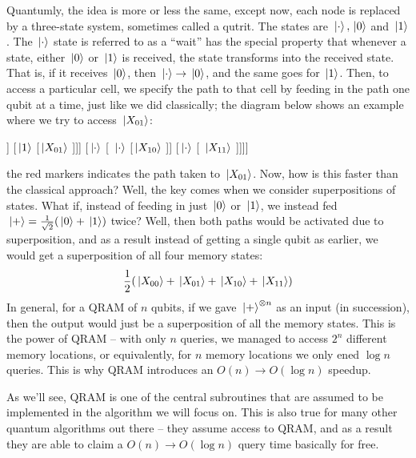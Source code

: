 \documentclass[11pt]{article}
\begin{document}
	Quantumly, the idea is more or less the same, except now, each node is replaced by a three-state system, 
	sometimes called a qutrit. The states are \( \ket*{\cdot}, \ket*{0} \) and \( \ket*{1} \). The \( \ket*{\cdot} \) 
	state is referred to as a ``wait'' has the special property that whenever a state, either \( \ket*{0} \) 
	or \( \ket*{1} \) is received, the state transforms into the received state. That is, if it receives \( \ket*{0} \),
	then \( \ket*{\cdot} \to \ket*{0} \), and the same goes for \( \ket*{1} \). Then, to access a particular 
	cell, we specify the path to that cell by feeding in the path one qubit at a time, 
	just like we did classically; the diagram below shows an example 
	where we try to access \( \ket*{X_{01}} \):

	\begin{center}
		\begin{forest}
			[\( \cdot \) [\textcolor{red}{\( \ket*{0} \)} [\( \ket*{\cdot} \) [ \( \ket*{X_{00}} \)]] 
			[\textcolor{red}{\( \ket*{1} \)} 
			[\textcolor{red}{\( \ket*{X_{01}} \) }]]] [\( \ket*{\cdot} \) 
			[ \( \ket*{\cdot} \) [\( \ket*{X_{10}} \) ]] [\( \ket*{\cdot} \) [ \( \ket*{X_{11}} \) ]]]]
		\end{forest}
	\end{center}
	the red markers indicates the path taken to \( \ket*{X_{01}} \). Now, how is this faster than the classical 
	approach? Well, the key comes when we consider superpositions of states. What if, instead of feeding in  
	just \( \ket*{0} \) or \( \ket*{1} \), we instead fed \( \ket*{+} = \frac{1}{\sqrt{2} }(\ket*{0} + \ket*{1}) \) 
	twice? Well, then both paths would be activated due to superposition, and as a result instead of getting a single 
	qubit as earlier, we would get a superposition of all four memory states: 
	\[
	\frac{1}{2}(\ket*{X_{00}} + \ket*{X_{01}} + \ket*{X_{10}} + \ket*{X_{11}})
	\] 
	In general, for a QRAM of \( n \) qubits, if we gave \( \ket*{+}^{\otimes n} \) as an input (in succession), 
	then the output 
	would just be a superposition of all the memory states. This is the power of QRAM -- with  
	only \( n \) queries, we managed to access \( 2^{n} \) different memory locations, or equivalently, for \( n \) 
	memory locations we only ened \( \log n \) queries. This is why QRAM introduces an \( O(n) \to 
	O(\log n)\) speedup.   

	As we'll see, QRAM is one of the central subroutines that are assumed to be implemented in the algorithm we 
	will focus on. This is also true for many other quantum algorithms out there -- they assume access to 
	QRAM, and as a result they are able to claim a \( O(n) \to O(\log n) \) query time basically for free.  
\end{document}
